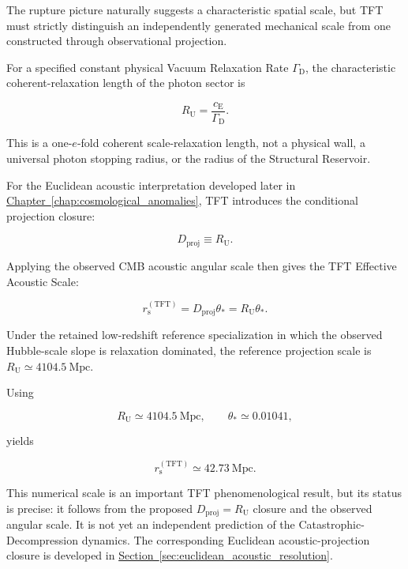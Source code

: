The rupture picture naturally suggests a characteristic spatial scale, but TFT must strictly distinguish an independently generated mechanical scale from one constructed through observational projection.

For a specified constant physical Vacuum Relaxation Rate $\Gamma_{\mathrm D}$, the characteristic coherent-relaxation length of the photon sector is

\begin{equation}
    R_{\mathrm U}
    =
    \frac{c_{\mathrm E}}{\Gamma_{\mathrm D}}.
\end{equation}

This is a one-$e$-fold coherent scale-relaxation length, not a physical wall, a universal photon stopping radius, or the radius of the Structural Reservoir.

For the Euclidean acoustic interpretation developed later in
\hyperref[chap:cosmological_anomalies]{Chapter~\ref*{chap:cosmological_anomalies}},
TFT introduces the conditional projection closure:

\begin{equation}
    D_{\mathrm{proj}}
    \equiv
    R_{\mathrm U}.
\end{equation}

Applying the observed CMB acoustic angular scale then gives the TFT Effective Acoustic Scale:

\begin{equation}
    r_{\mathrm s}^{(\mathrm{TFT})}
    =
    D_{\mathrm{proj}}\theta_*
    =
    R_{\mathrm U}\theta_*.
\end{equation}

Under the retained low-redshift reference specialization in which the observed Hubble-scale slope is relaxation dominated, the reference projection scale is
$R_{\mathrm U}\simeq4104.5\ \mathrm{Mpc}$.

Using

\begin{equation}
    R_{\mathrm U}
    \simeq
    4104.5\ \mathrm{Mpc},
    \qquad
    \theta_*
    \simeq
    0.01041,
\end{equation}

yields

\begin{equation}
    r_{\mathrm s}^{(\mathrm{TFT})}
    \simeq
    42.73\ \mathrm{Mpc}.
\end{equation}

This numerical scale is an important TFT phenomenological result, but its status is precise: it follows from the proposed $D_{\mathrm{proj}}=R_{\mathrm U}$ closure and the observed angular scale. It is not yet an independent prediction of the Catastrophic-Decompression dynamics. The corresponding Euclidean acoustic-projection closure is developed in
\hyperref[sec:euclidean_acoustic_resolution]{Section~\ref*{sec:euclidean_acoustic_resolution}}.

